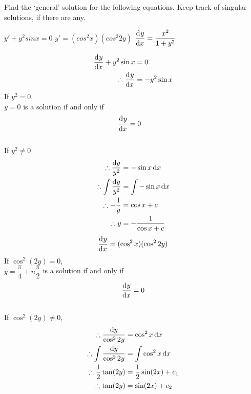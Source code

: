 \documentclass[fleqn, a4paper, 12pt, oneside]{amsart}
\theoremstyle{definition}
\theoremstyle{theorem}
\begin{document}
\begin{question}
	Find the `general' solution for the following equations. Keep track of singular solutions, if there are any.
	\begin{tasks}
		\task $y' + y^2 sin x = 0$
		\task $y' = (cos^2 x) (cos^2 2y)$
		\task $\dod{y}{x} = \dfrac{x^2}{1 + y^2}$
	\end{tasks}
\end{question}

\begin{solution}
	\begin{tasks}
		\task
			\begin{align*}
				\dod{y}{x} + y^2 \sin x &= 0\\
				\therefore \dod{y}{x} &= -y^2 \sin x\\
			\end{align*}
			If $y^2 = 0$,\\
			$y = 0$ is a solution if and only if
			\begin{align*}
				\dod{y}{x} &= 0
			\end{align*}
			~\\
			If $y^2 \neq 0$
			\begin{align*}
				\therefore \dfrac{\dif y}{y^2} &= -\sin x \dif x\\
				\therefore \int \dfrac{\dif y}{y^2} &= \int -\sin x \dif x\\
				\therefore -\dfrac{1}{y} &= \cos x + c\\
				\therefore y &= -\dfrac{1}{\cos x + c}
			\end{align*}
		\task
			\begin{align*}
				\dod{y}{x} &= (\cos^2 x) (\cos^2 2y)\\
			\end{align*}
			If $\cos^2 (2y) = 0$,\\
			$y = \dfrac{\pi}{4} + n \dfrac{\pi}{2}$ is a solution if and only if
			\begin{align*}
				\dod{y}{x} = 0
			\end{align*}
			~\\
			If $\cos^2 (2y) \neq 0$,
			\begin{align*}
				\therefore \dfrac{\dif y}{\cos^2 2y} &= \cos^2 x \dif x\\
				\therefore \int \dfrac{\dif y}{\cos^2 2y} &= \int \cos^2 x \dif x\\
				\therefore \dfrac{1}{2} \tan (2 y) &= \dfrac{1}{2} \sin (2x) + c_1\\
				\therefore \tan (2y) &= \sin (2x) + c_2\\

\end{align*}
\end{tasks}
\end{solution}
\end{document}
